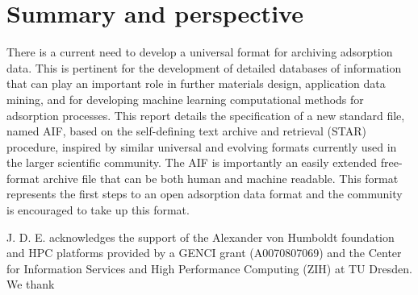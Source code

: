 \documentclass[journal=langd5,manuscript=article]{achemso}
\begin{document}
\section{Summary and perspective}
There is a current need to develop a universal format for archiving adsorption data.
This is pertinent for the development of detailed databases of information that can play an important role in further materials design, application data mining, and for developing machine learning computational methods for adsorption processes. \cite{10.1021/acs.chemmater.9b03376}
This report details the specification of a new standard file, named AIF, based on the self-defining text archive and retrieval (STAR) procedure, inspired by similar universal and evolving formats currently used in the larger scientific community.
The AIF is importantly an easily extended free-format archive file that can be both human and machine readable.
This format represents the first steps to an open adsorption data format and the community is encouraged to take up this format.




  




\begin{acknowledgement}
  J. D. E. acknowledges the support of the Alexander von Humboldt foundation and HPC platforms provided by a GENCI grant (A0070807069) and the Center for Information Services and High Performance Computing (ZIH) at TU Dresden.
  We thank 
\end{acknowledgement}
\end{document}
